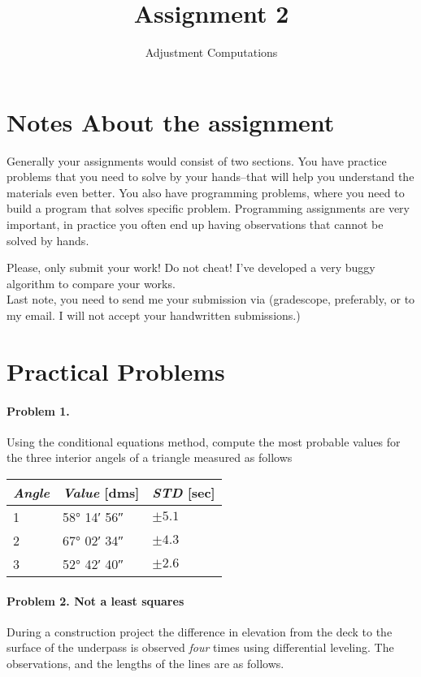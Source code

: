 \documentclass[]{scrartcl}
\title{Assignment 2}
\author{Adjustment Computations}
\begin{document}
\maketitle

\section*{Notes About the assignment}
Generally your assignments would consist of two sections. You have practice problems that you need to solve by your hands--that will help you understand the materials even better. You also have programming problems, where you need to build a program that solves specific problem. Programming assignments are very important, in practice you often end up having observations that cannot be solved by hands.

Please, only submit your work! Do not cheat! I've developed a very buggy algorithm to compare your works.
\\
Last note, you need to send me your submission via (gradescope, preferably, or to my email. I will not accept your handwritten submissions.)

\section{Practical Problems}
\paragraph{Problem 1.}
Using the conditional equations method, compute the most probable values for the three interior angels of a triangle measured as follows
\begin{table}[]
	\centering
	\label{table:table-1}
	\begin{tabular}{@{}lll@{}}
		\toprule
		\emph{Angle} & \emph{Value} [dms] & \emph{STD} [sec]\\
		\midrule
		1 & \ang{58; 14; 56} & $\pm 5.1$\\
		2 & \ang{67; 02; 34} & $\pm 4.3$\\
		3 & \ang{52; 42; 40} & $\pm 2.6$\\
		\bottomrule
	\end{tabular}
\end{table}

\paragraph{Problem 2. Not a least squares} During a construction project the difference in elevation from the deck to the surface of the underpass is observed \textit{four} times using differential leveling. The observations, and the lengths of the lines are as follows.
\end{document}
